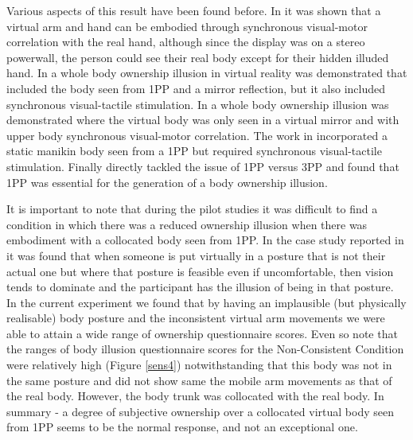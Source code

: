 \documentclass[
		twoside,openright,titlepage,numbers=noenddot,manychapters,
		headinclude,%
                footinclude=false,cleardoublepage=empty,
                BCOR=5mm,
		fontsize=11pt, %
                 enabledeprecatedfontcommands]{scrreprt}
\begin{document}
Various aspects of this result have been found before. In \cite{Sanchez-Vives2010} it was shown that a virtual arm and hand can be embodied through synchronous visual-motor correlation with the real hand, although since the display was on a stereo powerwall, the person could see their real body except for their hidden illuded hand. In \cite{Slater2010} a whole body ownership illusion in virtual reality was demonstrated that included the body seen from 1PP and a mirror reflection, but it also included synchronous visual-tactile stimulation. In \cite{Gonzalez-franco} a whole body ownership illusion was demonstrated where the virtual body was only seen in a virtual mirror and with upper body synchronous visual-motor correlation. The work in \cite{Petkova2008} incorporated a static manikin body seen from a 1PP but required synchronous visual-tactile stimulation. Finally \cite{Petkova2011} directly tackled the issue of 1PP versus 3PP and found that 1PP was essential for the generation of a body ownership illusion.

It is important to note that during the pilot studies it was difficult to find a condition in which there was a reduced ownership illusion when there was embodiment with a collocated body seen from 1PP. In the case study reported in \cite{Pena:Immersive:2010a} it was found that when someone is put virtually in a posture that is not their actual one but where that posture is feasible even if uncomfortable, then vision tends to dominate and the participant has the illusion of being in that posture. In the current experiment we found that by having an implausible (but physically realisable) body posture and the inconsistent virtual arm movements we were able to attain a wide range of ownership questionnaire scores. Even so note that the ranges of body illusion questionnaire scores for the Non-Consistent Condition were relatively high (Figure \ref{sens4}) notwithstanding that this body was not in the same posture and did not show same the mobile arm movements as that of the real body. However, the body trunk was collocated with the real body. In summary - a degree of subjective ownership over a collocated virtual body seen from 1PP seems to be the normal response, and not an exceptional one.
\end{document}
